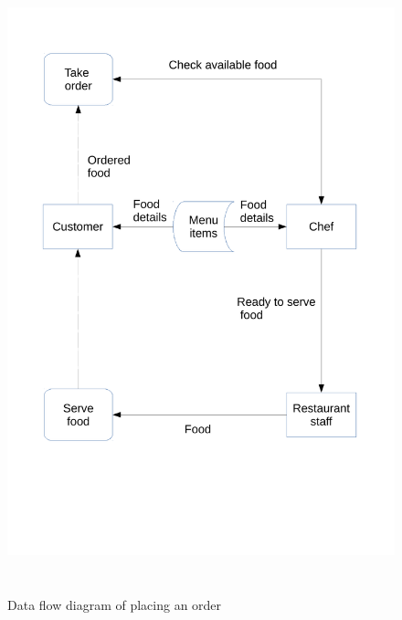 \begin{figure}[H]
    \includegraphics[height = 18cm]{./Analysis/PlacingOrder}
    \caption{Data flow diagram of placing an order} \label{fig:Data_flow_diagram}
\end{figure}

